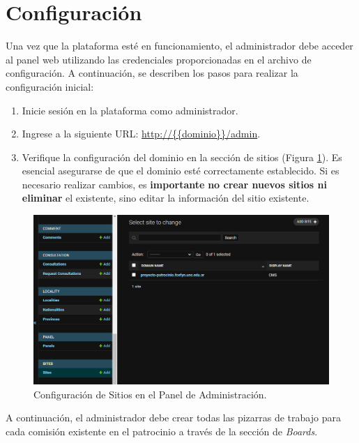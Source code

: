 \section{Configuración}

Una vez que la plataforma esté en funcionamiento, el administrador debe acceder al panel web utilizando las credenciales proporcionadas en el archivo de configuración. A continuación, se describen los pasos para realizar la configuración inicial:

\begin{enumerate}
    \item Inicie sesión en la plataforma como administrador.
    \item Ingrese a la siguiente URL: \url{http://{{dominio}}/admin}.
    
    \item Verifique la configuración del dominio en la sección de sitios (Figura \ref{fig:config-sites}). Es esencial asegurarse de que el dominio esté correctamente establecido. Si es necesario realizar cambios, es \textbf{importante}\textbf{ no crear nuevos sitios ni eliminar} el existente, sino editar la información del sitio existente.
\end{enumerate}

\begin{figure}[H]
    \centering
    \includegraphics[width=1\linewidth]{fig/sites.png}
    \caption{Configuración de Sitios en el Panel de Administración.}
    \label{fig:config-sites}
\end{figure}


A continuación, el administrador debe crear todas las pizarras de trabajo para cada comisión existente en el patrocinio a través de la sección de \textit{Boards}.

